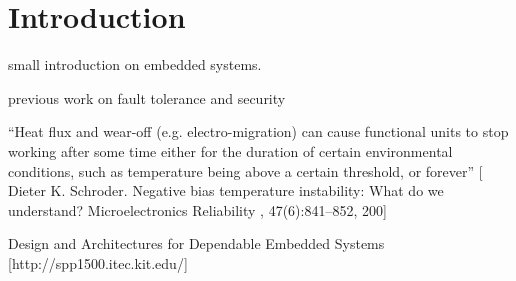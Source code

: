 \section{Introduction}

small introduction on embedded systems.

previous work on fault tolerance and security

``Heat flux and wear-off (e.g. electro-migration) can cause functional units to stop working after some time either for the duration of certain environmental conditions, such as temperature being above a certain threshold, or forever'' [ Dieter K. Schroder. Negative bias temperature instability: What do we understand? Microelectronics Reliability , 47(6):841–852, 200]

Design and Architectures for Dependable Embedded Systems [http://spp1500.itec.kit.edu/]
